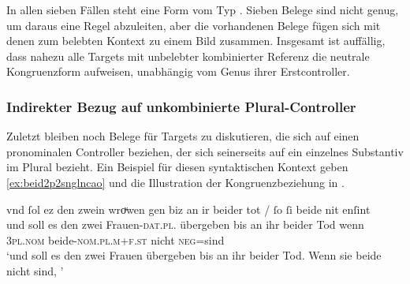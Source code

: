 In allen sieben Fällen steht eine Form vom Typ . Sieben Belege
sind nicht genug, um daraus eine Regel abzuleiten, aber die vorhandenen Belege
fügen sich mit denen zum belebten Kontext zu einem Bild zusammen. Insgesamt ist
auffällig, dass nahezu alle Targets mit unbelebter kombinierter Referenz die
neutrale Kongruenzform  aufweisen, unabhängig vom Genus ihrer
Erstcontroller.

\subsubsection{Indirekter Bezug auf unkombinierte Plural-Controller}
\label{subsubsec:beid2p2snglncao}

Zuletzt bleiben noch Belege für Targets zu diskutieren, die sich auf einen
pronominalen Controller beziehen, der sich seinerseits auf ein einzelnes
Substantiv im Plural bezieht. Ein Beispiel für diesen syntaktischen Kontext
geben \cref{ex:beid2p2snglncao} und die Illustration der Kongruenzbeziehung in
.

\begin{exe}
\ex \label{ex:beid2p2snglncao}
	\gll vnd ſol ez den zwein wroͮwen gen biz an ir beider tot / ſo
		ſi beide nit enſint \textelp{} \\
		und soll es den zwei Frauen-\textsc{dat.pl.\FemF} übergeben bis an ihr
		beider Tod {} wenn \textsc{3pl\subF.nom} beide-\textsc{nom.pl.m+f\subF.st}
		nicht \textsc{neg}=sind {} \\
	\trans `und soll es den zwei Frauen übergeben bis an ihr beider Tod.
		Wenn sie beide nicht  sind, \textelp{}'
		\parencites(Nr.~2568, Sirnau, Kr.~Esslingen, 1297)[3,31]{cao4}
\end{exe}

